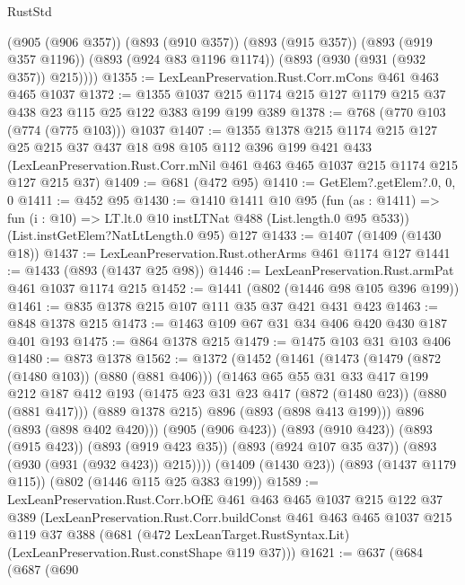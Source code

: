 \begin{lexlean}{RustStd}
\begin{coremodule}
        (@905 (@906 @357))
        (@893 (@910 @357))
        (@893 (@915 @357))
        (@893 (@919 @357 @1196))
        (@893 (@924 @83 @1196 @1174))
        (@893 (@930 (@931 (@932 @357)) @215))))
@1355 := LexLeanPreservation.Rust.Corr.mCons @461 @463 @465 @1037
@1372 := @1355 @1037 @215 @1174 @215 @127 @1179 @215 @37 @438 @23 @115 @25 @122 @383 @199 @199 @389
@1378 := @768 (@770 @103 (@774 (@775 @103))) @1037
@1407 := @1355
    @1378
    @215
    @1174
    @215
    @127
    @25
    @215
    @37
    @437
    @18
    @98
    @105
    @112
    @396
    @199
    @421
    @433
    (LexLeanPreservation.Rust.Corr.mNil @461 @463 @465 @1037 @215 @1174 @215 @127 @215 @37)
@1409 := @681 (@472 @95)
@1410 := GetElem?.getElem?.{0, 0, 0}
@1411 := @452 @95
@1430 := @1410
    @1411
    @10
    @95
    (fun (as : @1411) => fun (i : @10) => LT.lt.{0} @10 instLTNat @488 (List.length.{0} @95 @533))
    (List.instGetElem?NatLtLength.{0} @95)
    @127
@1433 := @1407 (@1409 (@1430 @18))
@1437 := LexLeanPreservation.Rust.otherArms @461 @1174 @127
@1441 := @1433 (@893 (@1437 @25 @98))
@1446 := LexLeanPreservation.Rust.armPat @461 @1037 @1174 @215
@1452 := @1441 (@802 (@1446 @98 @105 @396 @199))
@1461 := @835 @1378 @215 @107 @111 @35 @37 @421 @431 @423
@1463 := @848 @1378 @215
@1473 := @1463 @109 @67 @31 @34 @406 @420 @430 @187 @401 @193
@1475 := @864 @1378 @215
@1479 := @1475 @103 @31 @103 @406
@1480 := @873 @1378
@1562 := @1372
    (@1452
      (@1461
        (@1473
          (@1479 (@872 (@1480 @103)) (@880 (@881 @406)))
          (@1463
            @65
            @55
            @31
            @33
            @417
            @199
            @212
            @187
            @412
            @193
            (@1475 @23 @31 @23 @417 (@872 (@1480 @23)) (@880 (@881 @417)))
            (@889 @1378 @215)
            @896
            (@893 (@898 @413 @199)))
          @896
          (@893 (@898 @402 @420)))
        (@905 (@906 @423))
        (@893 (@910 @423))
        (@893 (@915 @423))
        (@893 (@919 @423 @35))
        (@893 (@924 @107 @35 @37))
        (@893 (@930 (@931 (@932 @423)) @215))))
    (@1409 (@1430 @23))
    (@893 (@1437 @1179 @115))
    (@802 (@1446 @115 @25 @383 @199))
@1589 := LexLeanPreservation.Rust.Corr.bOfE
    @461
    @463
    @465
    @1037
    @215
    @122
    @37
    @389
    (LexLeanPreservation.Rust.Corr.buildConst
      @461
      @463
      @465
      @1037
      @215
      @119
      @37
      @388
      (@681 (@472 LexLeanTarget.RustSyntax.Lit) (LexLeanPreservation.Rust.constShape @119 @37)))
@1621 := @637
    (@684
      (@687
        (@690

\end{coremodule}
\end{lexlean}
